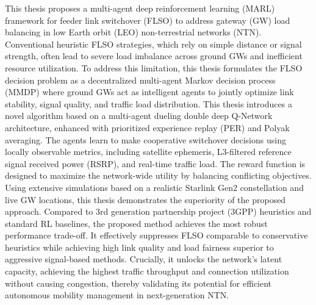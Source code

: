 


\begin{abstracts}
\quad This thesis proposes a multi-agent deep reinforcement learning (MARL) framework for feeder link switchover (FLSO) to address gateway (GW) load balancing in low Earth orbit (LEO) non-terrestrial networks (NTN). Conventional heuristic FLSO strategies, which rely on simple distance or signal strength, often lead to severe load imbalance across ground GWs and inefficient resource utilization. To address this limitation, this thesis formulates the FLSO decision problem as a decentralized multi-agent Markov decision process (MMDP) where ground GWs act as intelligent agents to jointly optimize link stability, signal quality, and traffic load distribution. This thesis introduces a novel algorithm based on a multi-agent dueling double deep Q-Network architecture, enhanced with prioritized experience replay (PER) and Polyak averaging. The agents learn to make cooperative switchover decisions using locally observable metrics, including satellite ephemeris, L3-filtered reference signal received power (RSRP), and real-time traffic load. The reward function is designed to maximize the network-wide utility by balancing conflicting objectives. Using extensive simulations based on a realistic Starlink Gen2 constellation and live GW locations, this thesis demonstrates the superiority of the proposed approach. Compared to 3rd generation partnership project (3GPP) heuristics and standard RL baselines, the proposed method achieves the most robust performance trade-off. It effectively suppresses FLSO comparable to conservative heuristics while achieving high link quality and load fairness superior to aggressive signal-based methods. Crucially, it unlocks the network's latent capacity, achieving the highest traffic throughput and connection utilization without causing congestion, thereby validating its potential for efficient autonomous mobility management in next-generation NTN.


\end{abstracts}
